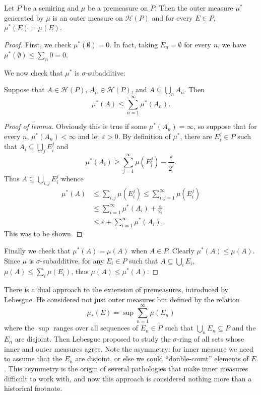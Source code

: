 \begin{theorem}
Let $P$ be a semiring and $\mu$ be a premeasure on $P$. Then the outer measure $\mu^*$ generated by $\mu$ is an outer measure on $\mathcal H(P)$ and for every $E \in P$, $\mu^*(E) = \mu(E)$.
\end{theorem}
\begin{proof}
First, we check $\mu^*(\emptyset) = 0$. In fact, taking $E_{n} = \emptyset$ for every $n$, we have $\mu^*(\emptyset) \leq \sum_{n} 0 = 0$.

We now check that $\mu^*$ is $\sigma$-subadditive:
\begin{lemma}
Suppose that $A \in \mathcal H(P)$, $A_{n} \in \mathcal H(P)$, and $A \subseteq \bigcup_{n} A_{n}$. Then
\[\mu^*(A) \leq \sum_{n=1}^{\infty} \mu^*(A_{n}).\]
\end{lemma}
\begin{proof}[Proof of lemma]
Obviously this is true if some $\mu^*(A_{n}) = \infty$, so suppose that for every $n$, $\mu^*(A_{n}) < \infty$ and let $\varepsilon > 0$.
By definition of $\mu^*$, there are $E_i^{j} \in P$ such that $A_{i} \subseteq \bigcup_{j} E_i^j$
and
\[\mu^*(A_i) \geq \sum_{j=1}^{\infty} \mu(E_i^j) - \frac{\varepsilon}{2^i}.\]
Thus $A \subseteq \bigcup_{i,j}E_i^j$ whence
\begin{align*}\mu^*(A) &\leq \sum_{i,j} \mu(E_i^j) \leq \sum_{i,j=1}^{\infty} \mu(E_i^j)\\ &\leq \sum_{i=1}^{\infty} \mu^*(A_i) + \frac{\varepsilon}{2_i}\\& \leq \varepsilon + \sum_{i=1}^{\infty} \mu^*(A_i).\end{align*}
This was to be shown.
\end{proof}

Finally we check that $\mu^*(A) = \mu(A)$ when $A \in P$. Clearly $\mu^*(A) \leq \mu(A)$.
Since $\mu$ is $\sigma$-subadditive, for any $E_{i} \in P$ such that $A \subseteq \bigcup_{i} E_i$, $\mu(A) \leq \sum_{i} \mu(E_i)$, thus $\mu(A) \leq \mu^*(A)$.
\end{proof}

\begin{subsec}
There is a dual approach to the extension of premeasures, introduced by Lebesgue.
He considered not just outer measures but  defined by the relation
\[\mu_*(E) = \sup \sum_{n=1}^{\infty} \mu(E_{n})\]
where the $\sup$ ranges over all sequences of $E_{n} \in P$ such that $\bigcup_{n} E_{n} \subseteq P$ and the $E_{n}$ are disjoint.
Then Lebesgue proposed to study the $\sigma$-ring of all sets whose inner and outer measures agree.
Note the asymmetry: for inner measure we need to assume that the $E_{n}$ are disjoint, or else we could ``double-count'' elements of $E$.
This asymmetry is the origin of several pathologies that make inner measures difficult to work with, and now this approach is considered nothing more than a historical footnote.
\end{subsec}

